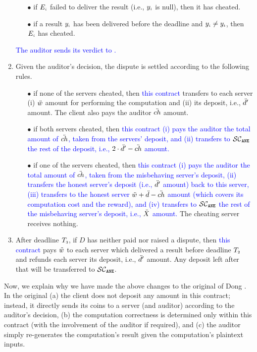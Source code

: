 \begin{enumerate}
%
\begin{itemize}
%
\item[$\bullet$] if $E_{\scriptscriptstyle i}$ failed to deliver the result (i.e., $y_{\scriptscriptstyle i}$ is null), then it has cheated. 
%
\item[$\bullet$] if a result $y_{\scriptscriptstyle i}$ has been delivered before the deadline and $y_{\scriptscriptstyle i}\neq y_{\scriptscriptstyle t}$, then $E_{\scriptscriptstyle i}$ has cheated. 
%
\end{itemize}
%
\textcolor{blue}{The auditor sends its verdict to \SCpc.} 
%
\item Given the auditor's decision, the dispute is settled according to the following rules.
%
\begin{itemize}
%
\item[$\bullet$] if none of the servers cheated, then \textcolor{blue}{this contract} transfers to each server (i) $\ddot{w}$ amount for performing the computation and (ii) its deposit, i.e., $\ddot{d}'$ amount. The client also pays the auditor $\ddot{ch}$ amount.  
%
\item[$\bullet$] if both servers cheated, then \textcolor{blue}{this contract (i) pays the auditor the total amount of $\ddot{ch}$, taken from the servers' deposit, and (ii) transfers to  $\mathcal{SC}_{\mathtt{ANE}}$ the rest of the deposit, i.e., $2\cdot \ddot{d}'-\ddot{ch}$ amount.} 
%
\item[$\bullet$] if one of the servers cheated, then \textcolor{blue}{this contract (i) pays the auditor the total amount of $\ddot{ch}$, taken from the misbehaving server's deposit, (ii) transfers the honest server's deposit (i.e., $\ddot{d}'$ amount) back to this server,  (iii) transfers to the honest server $\ddot{w}+\ddot{d}-\ddot{ch}$ amount (which covers its computation cost and the reward), and  (iv) transfers to $\mathcal{SC}_{\mathtt{ANE}}$ the rest of the misbehaving server's deposit, i.e., $\ddot{X}$ amount.} The cheating server receives nothing.  
%
\end{itemize} 
%
\item After deadline $T_{\scriptscriptstyle 3}$, if $ { D}$ has neither paid nor raised a dispute, then \textcolor{blue}{this contract} pays $\ddot{w}$ to each server which delivered a result before deadline $T_{\scriptscriptstyle 2}$ and refunds each server its deposit, i.e., $\ddot{d}'$ amount. Any deposit left after that will be transferred to \textcolor{blue}{$\mathcal{SC}_{\mathtt{ANE}}$}. 
%
\end{enumerate}


Now, we explain why we have made the above changes to the original \SCpc of Dong \et \cite{dong2017betrayal}. In the original \SCpc (a) the client does not deposit any amount in this contract; instead, it directly sends its coins to a server (and auditor) according to the auditor's decision,  (b) the computation correctness is determined only within this contract (with the involvement of the auditor if required), and (c)  the auditor simply re-generates the computation's result given the computation's plaintext inputs.  

